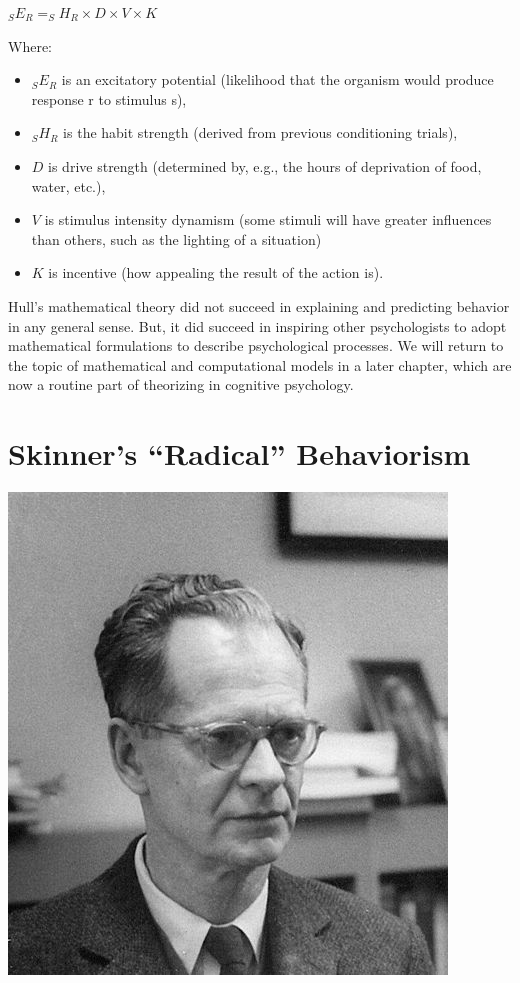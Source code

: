 \documentclass[
  oneside,
  12pt]{crumpbook}
\newenvironment{floatright25}{%
  \wrapfigure{R}{.25\textwidth}%
  }{%
  \endwrapfigure}
\begin{document}
\(_SE_R = _SH_R × D × V × K\)

Where:

\begin{itemize}
\item
  \(_SE_R\) is an excitatory potential (likelihood that the organism would produce response r to stimulus s),
\item
  \(_SH_R\) is the habit strength (derived from previous conditioning trials),
\item
  \(D\) is drive strength (determined by, e.g., the hours of deprivation of food, water, etc.),
\item
  \(V\) is stimulus intensity dynamism (some stimuli will have greater influences than others, such as the lighting of a situation)
\item
  \(K\) is incentive (how appealing the result of the action is).
\end{itemize}

Hull's mathematical theory did not succeed in explaining and predicting behavior in any general sense. But, it did succeed in inspiring other psychologists to adopt mathematical formulations to describe psychological processes. We will return to the topic of mathematical and computational models in a later chapter, which are now a routine part of theorizing in cognitive psychology.

\hypertarget{skinners-radical-behaviorism}{%
\section{Skinner's ``Radical'' Behaviorism}\label{skinners-radical-behaviorism}}

\begin{floatright25}
\includegraphics[width=1\linewidth]{imgs/bf_skinner}

\end{floatright25}
\end{document}
